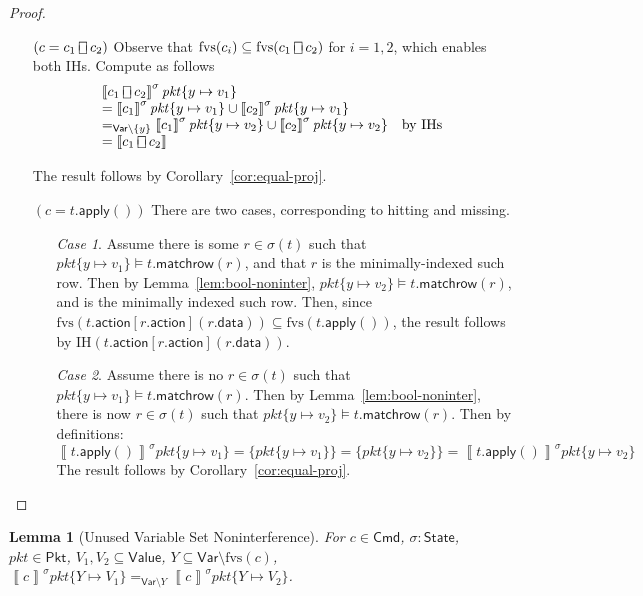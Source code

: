 \documentclass{article}
\newcommand{\pkt}{\mathit{pkt}}
\newcommand{\denote}[1]{\left\llbracket#1\right\rrbracket}
\newcommand{\Value}{\mathsf{Value}}
\newcommand{\Cmd}{\mathsf{Cmd}}
\newcommand{\Pkt}{\mathsf{Pkt}}
\newcommand{\Var}{\mathsf{Var}}
\newcommand{\State}{\mathsf{State}}
\newcommand{\action}{\mathsf{action}}
\newcommand{\data}{\mathsf{data}}
\newcommand{\apply}{\mathsf{apply}}
\newcommand{\choiceop}{\rotatebox[origin=c]{90}{$\sqsubset\!\!\!\sqsupset$}}
\newcommand{\choice}{\mathbin{\choiceop}}
\newcommand{\fvs}{\textrm{fvs}}
\newcommand{\matchrow}{\mathsf{matchrow}}
\theoremstyle{plain}
\newtheorem{lemma}{Lemma}
\theoremstyle{definition}
\theoremstyle{remark}
\begin{document}
\begin{proof}
\begin{enumerate}[align=left]
    \item[$(c = c_1 \choice c_2)$] Observe that $\fvs(c_i) \subseteq \fvs(c_1 \choice c_2)$ for
      $i = 1,2$, which enables both IHs. Compute as follows
      \[\begin{array}{ll}
      \denote{c_1 \choice c_2}^\sigma\pkt\{y \mapsto v_1\} \\
      = \denote{c_1}^\sigma\pkt\{y \mapsto v_1\} \cup \denote{c_2}^\sigma\pkt\{y \mapsto v_1\} \\
      =_{\Var \setminus \{y\}} \denote{c_1}^\sigma\pkt\{y \mapsto v_2\} \cup \denote{c_2}^\sigma\pkt\{y \mapsto v_2\}
      & \text{by IHs} \\
      = \denote{c_1 \choice c_2}
      \end{array}
      \]

      The result follows by Corollary~\ref{cor:equal-proj}.

    \item[$(c = t.\apply())$]
      There are two cases, corresponding to hitting and missing.
      \begin{enumerate}[align=left]
      \item[\textit{Case 1}.] Assume there is some $r \in \sigma(t)$ such that
        $\pkt\{y \mapsto v_1\} \models t.\matchrow(r)$, and that $r$ is the
        minimally-indexed such row. Then by Lemma~\ref{lem:bool-noninter},
        $\pkt\{y \mapsto v_2\} \models t.\matchrow(r)$, and is the minimally indexed such row. Then, since
        $\fvs(t.\action[r.\action](r.\data)) \subseteq \fvs(t.\apply())$, the
        result follows by IH$(t.\action[r.\action](r.\data))$.

        \item[\textit{Case 2}.] Assume there is no $r \in \sigma(t)$ such that
          $\pkt\{y \mapsto v_1\} \models t.\matchrow(r)$. Then by
          Lemma~\ref{lem:bool-noninter}, there is now $r \in \sigma(t)$ such
          that $\pkt\{y \mapsto v_2\} \models t.\matchrow(r)$. Then by definitions:
          \[\denote{t.\apply()}^\sigma \pkt\{y \mapsto v_1\} = \{\pkt\{y \mapsto v_1\}\} = \{\pkt\{y \mapsto v_2\}\} = \denote{t.\apply()}^\sigma \pkt\{y \mapsto v_2\}\]
          The result follows by Corollary~\ref{cor:equal-proj}.
      \end{enumerate}

  \end{enumerate}
\end{proof}


\begin{lemma}[Unused Variable Set Noninterference]
  \label{lem:param-noninter-set}
  For $c \in \Cmd$, $\sigma : \State$, $\pkt \in \Pkt$,
  $V_1,V_2 \subseteq \Value$, $Y \subseteq \Var \setminus \fvs(c)$,
  $\denote{c}^\sigma \pkt\{Y \mapsto V_1\} =_{\Var \setminus Y}\denote{c}^\sigma\pkt\{Y \mapsto V_2\}$.
\end{lemma}
\end{document}
